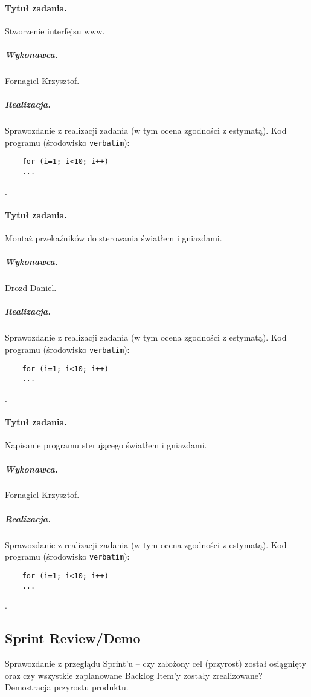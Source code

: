 	\paragraph{Tytuł zadania.} Stworzenie interfejsu www.
	\subparagraph{Wykonawca.} Fornagiel Krzysztof.
	\subparagraph{Realizacja.} Sprawozdanie z realizacji zadania (w tym ocena zgodności z estymatą). Kod programu (środowisko \texttt{verbatim}): \begin{verbatim}
	for (i=1; i<10; i++)
	...
	\end{verbatim}.
	
	\paragraph{Tytuł zadania.} Montaż przekaźników do sterowania światłem i gniazdami.
	\subparagraph{Wykonawca.} Drozd Daniel.
	\subparagraph{Realizacja.} Sprawozdanie z realizacji zadania (w tym ocena zgodności z estymatą). Kod programu (środowisko \texttt{verbatim}): \begin{verbatim}
	for (i=1; i<10; i++)
	...
	\end{verbatim}.
	
	\paragraph{Tytuł zadania.} Napisanie programu sterującego światłem i gniazdami.
	\subparagraph{Wykonawca.} Fornagiel Krzysztof.
	\subparagraph{Realizacja.} Sprawozdanie z realizacji zadania (w tym ocena zgodności z estymatą). Kod programu (środowisko \texttt{verbatim}): \begin{verbatim}
	for (i=1; i<10; i++)
	...
	\end{verbatim}.

	
	\subsection{Sprint Review/Demo}
	Sprawozdanie z przeglądu Sprint'u -- czy założony cel (przyrost) został osiągnięty oraz czy wszystkie zaplanowane Backlog Item'y zostały zrealizowane? Demostracja przyrostu produktu.
	